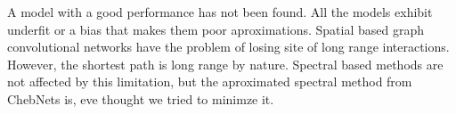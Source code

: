 
A model with a good performance has not been found. All the models exhibit underfit or a bias that makes them poor aproximations.
Spatial based graph convolutional networks have the problem of losing site of long range interactions. However, the shortest path is long range by nature.
Spectral based methods are not affected by this limitation, but the aproximated spectral method from ChebNets is, eve thought we tried to minimze it.







